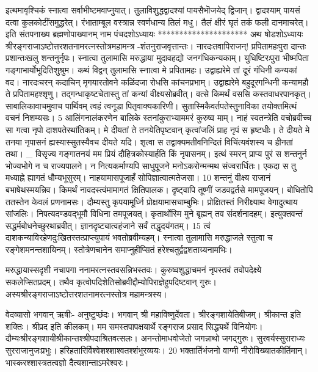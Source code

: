इत्थमावृश्चिकं स्नात्वा सर्वाभीष्टमवाप्नुयात्।
 तुलाविशुद्धद्वादश्यां पायसैभॊजयेद् द्विजान्।
 द्वादश्याम् पायसं दत्वा कुलकोटींसमुद्धरेत्।
 रंभाताम्बूल वस्त्रान्न स्वर्णधान्य तिलं मधु।
 तैलं क्षीरं घृतं तकं फली दानमाचरेत्।
 इति संतपनाख्य ब्रह्मणोपाख्यानम् नाम
पंचदशोऽध्यायः
*********************
अथ षोडशोऽध्यायः श्रीरङ्गराजाऽष्टोत्तरशतनामरत्नस्तोत्रमहामन्त्र
-शंतनुराजवृत्तान्तः।
 नारदःतवापिराजन्! प्रपितामहःपुरा दान्तः
प्रशान्तःखलु शन्तनुर्नृपः।
 स्नात्वा तुलामासि मरुद्धाया
मुदावहद्यो जनगंधिकन्यकाम्।
 युधिष्टिरःपुरा भीष्मपिता गङ्गाभार्योभूदितिशुश्रुम।
 कथं विद्वन् तुलामासि स्नात्वा मे प्रपितामहः।
 उद्वाह्यरेमे तां दूरं गंधिनी कन्यकां वद।
 नारदःचरन् कदाचिन् मृगयारतोवने
कळिंदजा रोधसि कांचनप्रभाम्।
 उद्वाह्यरेमे बहुदूरगन्धिनी
कन्यामहौ ते प्रपितामहश्शृणु।
 तद्गन्धाकृष्टचेतास्तु तां कन्यां वीक्ष्यसोब्रवीत्।
 वत्से किमर्थं वससि कस्तवाधरपानकृत्।
 साबालिकावाचमुवाच पार्थिवम्
त्वहं त्वनूडा पितृवाक्यकारिणी।
 सुतास्मिकैवर्तपतेस्तुनाविका
तयोक्तमित्थं वचनं निशम्यसः।
5 आलिंगनालंकरणेन बालिके
स्तनांकुराभ्याममरं कुरुष्व माम्।
 नाहं स्वतन्त्रेति वचोब्रवीच्च सा
गत्वा नृपो दाशपतेरथांतिकम्।
 मे दीयतां ते तनयेतिपृष्टवान्
कृत्वांजलिं प्राह नृपं स हृष्टधीः।
 ते दीयते मे तनया नृपासनं
ह्यस्यास्सुतस्यैवच दीयते यदि।
 शृत्वा स तद्वाक्यमतीवनिन्दितं
विचिंत्यवंशस्य च हीनतां तथा।
 _ विसृज्य गङ्गातनयं मम प्रियं
दौहित्रकोस्यार्हति किं नृपासनम्।
 इत्थं स्मरन् प्राप्य पुरं स शन्तनुर्न
भोज्यभोगे न च राज्यपालने।
 न नित्यकर्माण्यपि साधुपूजने मनोऽकरोन्मन्मथ संज्वरार्धितः।
 एकदा स तु मध्याह्ने ह्यागतं धौम्यभूसुरम्।
 नाहयामासपूजाहँ सोपिज्ञात्वात्मतेजसा।
 10 शन्तनुं वीक्ष्य राजानं बभाषेथस्मयन्निव।
 किमर्थं नावदस्त्वंमामागतं क्षितिपालक।
 दृष्ट्वापि तूष्णीं जडवद्वर्तसे मामपूजयन्।
 बोधितोपि ततस्तेन केवलं प्रणनामसः।
 दौम्यस्तु कृपयामूर्ध्नि प्रोक्षयामासचाम्बुभिः।
 प्रोक्षितस्तं निरीक्ष्याथ वेगादुत्थाय सांजलिः।
 निपत्यदण्डवद्भूमौ विधिना तमपूजयत्।
 कृतार्थोस्मि मुने बृह्मन् तव संदर्शनादहम्।
 इत्युक्तवन्तं सद्धर्मबोधनेच्छुरथाब्रवीत्।
 ज्ञानदृष्ट्यात्वहंजाने सर्वं तद्धृदयंगतम्।
 15 त्वं दाशकन्याविरहेणदुःखितस्तत्प्राप्त्युपायं भवतोब्रवीम्यहम्।
 स्नात्वा तुलामासि मरुद्धाजले स्तुत्वा च रङ्गेशमनन्तशायिनम्।
 स्तोत्रेणचानेन समाप्नुहीप्सितं हरेश्चतुर्द्वद्वशताग्र्यनामभिः।
 
मरुद्धायास्सदृशी नचापगा ननामरत्नस्तवसन्निभस्तवः।
 कुरुष्वशुद्धाचमनं नृपस्तवं तवोपदेक्ष्ये सकलेप्सितप्रदम्।
 तथैव कृत्वोपदिशेतिसोब्रवीद्दौम्योपिराज्ञेहुपदिष्टवान्
गुरुः।
 अस्यश्रीरङ्गराजाऽष्टोत्तरशतनामरत्नस्तोत्र
महामन्त्रस्य।

वेदव्यासो भगवान् ऋषीः- अनुष्टुप्छंदः।
 भगवान् श्री महाविष्णुर्देवता।
 श्रीरङ्गशायेतिबीजम्।
 श्रीकान्त इति शक्तिः।
 श्रीप्रद इति कीलकम्।
 मम समस्तपापक्षयार्थे रङ्गराज प्रसाद सिद्ध्यर्थे विनियोगः।
 दौम्यःश्रीरङ्गशायीश्रीकान्तश्श्रीपदाश्रितवत्सलः।
 अनन्तोमाधवोजेतो जगन्नाथो जगद्गुरुः।
 सुरवर्यस्सुराराध्यः सुरराजानुजःप्रभुः।
 हरिहतारिर्विश्वेशश्शाश्वतश्शंभुरव्ययः।
 20 भक्तार्तिभंजनो वाग्मी नीरोविख्यातकीर्तिमान्।
 भास्करश्शास्त्रतत्वज्ञो दैत्यशान्ताऽमरेश्वरः।
 
